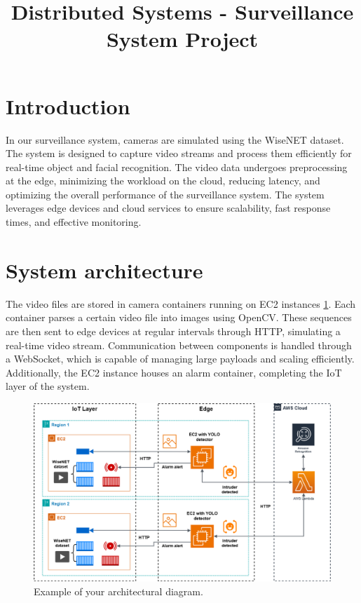 \documentclass[conference]{IEEEtran}
\begin{document}
\title{Distributed Systems - Surveillance System Project}

\author{
\and
{}
\and
{}
}

\maketitle

\section{Introduction}
In our surveillance system, cameras are simulated using the WiseNET dataset. The system is designed to capture video streams and process them efficiently for real-time object and facial recognition. The video data undergoes preprocessing at the edge, minimizing the workload on the cloud, reducing latency, and optimizing the overall performance of the surveillance system. The system leverages edge devices and cloud services to ensure scalability, fast response times, and effective monitoring.  

\section{System architecture}
The video files are stored in camera containers running on EC2 instances \ref{fig:architecture}. Each container parses a certain video file into images using OpenCV. These sequences are then sent to edge devices at regular intervals through HTTP, simulating a real-time video stream. Communication between components is handled through a WebSocket, which is capable of managing large payloads and scaling efficiently. Additionally, the EC2 instance houses an alarm container, completing the IoT layer of the system.

\begin{figure}[h!]
    \centering
    \includegraphics[width=1\linewidth]{DS_architecture_version2.png}
    \caption{Example of your architectural diagram.}
    \label{fig:architecture}
\end{figure}
\end{document}
